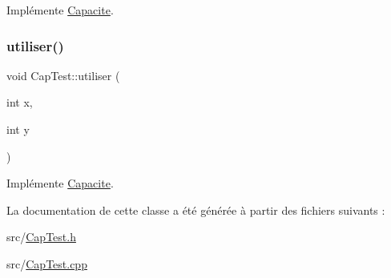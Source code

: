 Implémente \hyperlink{class_capacite_a7d4e86c20cd198960f25c0eb443148fe}{Capacite}.

\mbox{\label{class_cap_test_af85984f6d9330e5527feff1a62ee4242}} 
\subsubsection{\texorpdfstring{utiliser()}{utiliser()}}
{\footnotesize\ttfamily void Cap\+Test\+::utiliser (\begin{DoxyParamCaption}\item[{int}]{x,  }\item[{int}]{y }\end{DoxyParamCaption})\hspace{0.3cm}{\ttfamily [virtual]}}



Implémente \hyperlink{class_capacite_a4d4f643987fcc2168567bf28a36ea418}{Capacite}.



La documentation de cette classe a été générée à partir des fichiers suivants \+:\begin{DoxyCompactItemize}
\item 
src/\hyperlink{_cap_test_8h}{Cap\+Test.\+h}\item 
src/\hyperlink{_cap_test_8cpp}{Cap\+Test.\+cpp}\end{DoxyCompactItemize}
